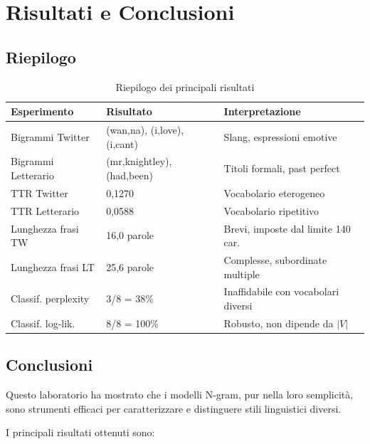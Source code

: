 \documentclass[12pt, a4paper]{article}
\begin{document}
\section{Risultati e Conclusioni}

\subsection{Riepilogo}

\begin{table}[H]
\centering
\begin{tabular}{p{4cm}p{4cm}p{5cm}}
\toprule
\textbf{Esperimento} & \textbf{Risultato} & \textbf{Interpretazione} \\
\midrule
Bigrammi Twitter     & (wan,na), (i,love), (i,cant) &
Slang, espressioni emotive \\
Bigrammi Letterario  & (mr,knightley), (had,been) &
Titoli formali, past perfect \\
TTR Twitter          & 0,1270 &
Vocabolario eterogeneo \\
TTR Letterario       & 0,0588 &
Vocabolario ripetitivo \\
Lunghezza frasi TW   & 16,0 parole &
Brevi, imposte dal limite 140 car. \\
Lunghezza frasi LT   & 25,6 parole &
Complesse, subordinate multiple \\
Classif. perplexity  & 3/8 = 38\% &
Inaffidabile con vocabolari diversi \\
Classif. log-lik.    & 8/8 = 100\% &
Robusto, non dipende da $|V|$ \\
\bottomrule
\end{tabular}
\caption{Riepilogo dei principali risultati}
\end{table}

\subsection{Conclusioni}

Questo laboratorio ha mostrato che i modelli N-gram, pur nella loro
semplicità, sono strumenti efficaci per caratterizzare e distinguere
stili linguistici diversi.

I principali risultati ottenuti sono:
\end{document}
